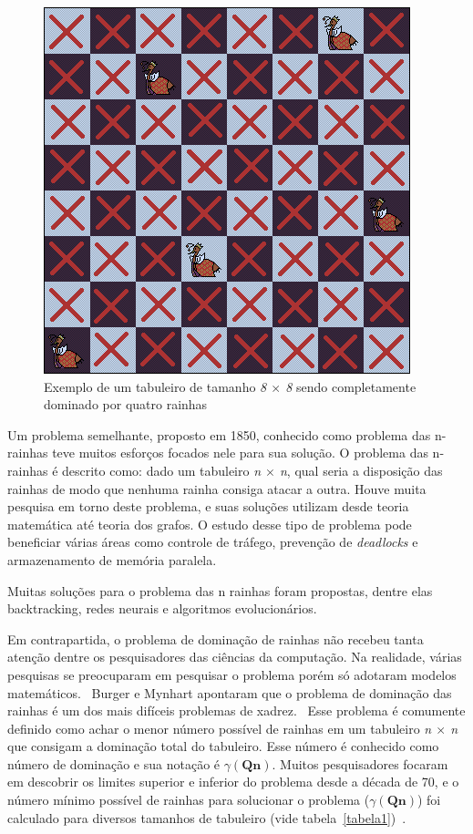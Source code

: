\documentclass[
	article,			%
	11pt,				%
	oneside,			%
	a4paper,			%
	english,			%
	brazil,				%
	sumario=tradicional
	]{abntex2}
\begin{document}
\begin{figure}
  \centering
  \includegraphics[width=0.60\linewidth]{dom2rainha8x8.png}
  \caption{Exemplo de um tabuleiro de tamanho \textit{8 $\times$ 8} sendo completamente dominado por
  quatro rainhas}
  \label{fig:2rainha}
\end{figure}

Um problema semelhante, proposto em 1850, conhecido como problema das n-rainhas teve muitos esforços focados nele para sua solução. O problema das n-rainhas é descrito como: dado um tabuleiro \textit{n $\times$ n}, qual seria a disposição das rainhas de modo que nenhuma rainha consiga atacar a outra. Houve muita pesquisa em torno deste problema, e suas soluções utilizam desde teoria matemática até teoria dos grafos. O estudo desse tipo de problema pode beneficiar várias áreas como controle de tráfego, prevenção de \textit{deadlocks} e armazenamento de memória paralela.~\cite{bell2009survey}

Muitas soluções para o problema das n rainhas foram propostas, dentre elas backtracking, redes neurais e algoritmos evolucionários.

Em contrapartida, o problema de dominação de rainhas não recebeu tanta atenção dentre os pesquisadores das ciências da computação. Na realidade, várias pesquisas se preocuparam em pesquisar o problema porém só adotaram modelos matemáticos.~\cite{alharbi2017genetic} Burger e Mynhart apontaram que o problema de dominação das rainhas é um dos mais difíceis problemas de xadrez.~\cite{art43}
Esse problema é comumente definido como achar o menor número possível de rainhas em um tabuleiro \textit{n $\times$ n} que consigam a dominação total do tabuleiro. Esse número é conhecido como número de dominação e sua notação é $\gamma(\textbf{Qn})$.
Muitos pesquisadores focaram em descobrir os limites superior e inferior do problema desde a década de 70,  e o número mínimo possível de rainhas para solucionar o problema ($\gamma(\textbf{Qn})$) foi calculado para diversos tamanhos de tabuleiro (vide tabela~\ref{tabela1})~\cite{art3,art43,art44,art45}.
\end{document}
